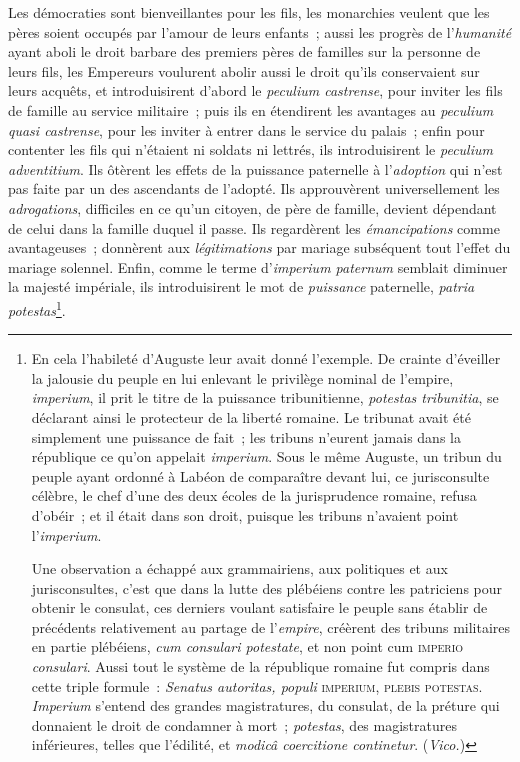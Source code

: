 \documentclass[french,twoside]{book} %
\begin{document}
Les démocraties sont bienveillantes pour les fils, les monarchies veulent que les pères soient occupés par l’amour de leurs enfants ; aussi les progrès de l’{\itshape humanité} ayant aboli le droit barbare des premiers pères de familles sur la personne de leurs fils, les Empereurs voulurent abolir aussi le droit qu’ils conservaient sur leurs acquêts, et introduisirent d’abord le {\itshape peculium castrense}, pour inviter les fils  de famille au service militaire ; puis ils en étendirent les avantages au {\itshape peculium quasi castrense}, pour les inviter à entrer dans le service du palais ; enfin pour contenter les fils qui n’étaient ni soldats ni lettrés, ils introduisirent le {\itshape peculium adventitium}. Ils ôtèrent les effets de la puissance paternelle à l’{\itshape adoption} qui n’est pas faite par un des ascendants de l’adopté. Ils approuvèrent universellement les {\itshape adrogations}, difficiles en ce qu’un citoyen, de père de famille, devient dépendant de celui dans la famille duquel il passe. Ils regardèrent les {\itshape émancipations} comme avantageuses ; donnèrent aux {\itshape légitimations} par mariage subséquent tout l’effet du mariage solennel. Enfin, comme le terme d’{\itshape imperium paternum} semblait diminuer la majesté impériale, ils introduisirent le mot de {\itshape puissance} paternelle, {\itshape patria potestas}\footnote{\noindent En cela l’habileté d’Auguste leur avait donné l’exemple. De crainte d’éveiller la jalousie du peuple en lui enlevant le privilège nominal de l’empire, {\itshape imperium}, il prit le titre de la puissance tribunitienne, {\itshape potestas tribunitia}, se déclarant ainsi le protecteur de la liberté romaine. Le tribunat avait été simplement une puissance de fait ; les tribuns n’eurent jamais dans la république ce qu’on appelait {\itshape imperium}. Sous le même Auguste, un tribun du peuple ayant ordonné à Labéon de comparaître devant lui, ce jurisconsulte célèbre, le chef d’une des deux écoles de la jurisprudence romaine, refusa d’obéir ; et il était dans son droit, puisque les tribuns n’avaient point l’{\itshape imperium}.\par
Une observation a échappé aux grammairiens, aux politiques et aux jurisconsultes, c’est que dans la lutte des plébéiens contre les patriciens pour obtenir le consulat, ces derniers voulant satisfaire le peuple sans établir de précédents relativement au partage de l’{\itshape empire}, créèrent des tribuns militaires en partie plébéiens, {\itshape cum consulari potestate}, et non point cum {\scshape imperio} {\itshape consulari}. Aussi tout le système de la république romaine fut compris dans cette triple formule : {\itshape Senatus autoritas, populi} {\scshape imperium, plebis potestas}. {\itshape Imperium} s’entend des grandes magistratures, du consulat, de la préture qui donnaient le droit de condamner à mort ; {\itshape potestas}, des magistratures inférieures, telles que l’édilité, et {\itshape modicâ coercitione continetur}. ({\itshape Vico.})
}.\par
\end{document}
